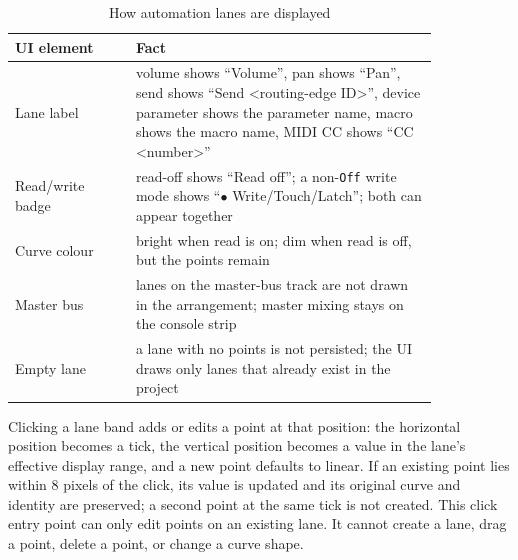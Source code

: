 \begin{table}[htbp]
\centering
\small
\begin{tabular}{@{}p{0.24\linewidth}p{0.60\linewidth}@{}}
\hline
UI element & Fact \\
\hline
Lane label & volume shows ``Volume'', pan shows ``Pan'', send shows ``Send <routing-edge ID>'', device parameter shows the parameter name, macro shows the macro name, MIDI CC shows ``CC <number>'' \\
Read/write badge & read-off shows ``Read off''; a non-\texttt{Off} write mode shows ``$\bullet$ Write/Touch/Latch''; both can appear together \\
Curve colour & bright when read is on; dim when read is off, but the points remain \\
Master bus & lanes on the master-bus track are not drawn in the arrangement; master mixing stays on the console strip \\
Empty lane & a lane with no points is not persisted; the UI draws only lanes that already exist in the project \\
\hline
\end{tabular}
\caption{How automation lanes are displayed}
\label{tab:automation-display}
\end{table}


Clicking a lane band adds or edits a point at that position: the horizontal position becomes a tick, the vertical position becomes a value in the lane's effective display range, and a new point defaults to linear. If an existing point lies within 8 pixels of the click, its value is updated and its original curve and identity are preserved; a second point at the same tick is not created. This click entry point can only edit points on an existing lane. It cannot create a lane, drag a point, delete a point, or change a curve shape.

